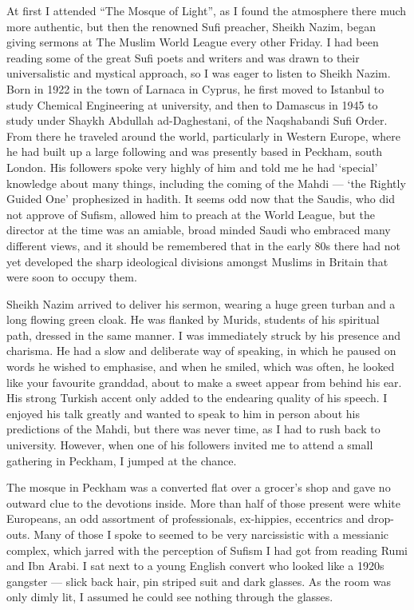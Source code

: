 \documentclass[12pt]{memoir}
\begin{document}
At first I attended “The Mosque of Light”,
as I found the atmosphere there much more authentic,
but then the renowned Sufi preacher, Sheikh Nazim,
began giving sermons at The Muslim World League every other Friday.
I had been reading some of the great Sufi poets and writers
and was drawn to their universalistic and mystical approach,
so I was eager to listen to Sheikh Nazim.
Born in 1922 in the town of Larnaca in Cyprus,
he first moved to Istanbul to study Chemical Engineering at university,
and then to Damascus in 1945 to study under Shaykh Abdullah ad-Daghestani,
of the Naqshabandi Sufi Order.
From there he traveled around the world, particularly in Western Europe,
where he had built up a large following and was presently based in Peckham,
south London.
His followers spoke very highly of him
and told me he had ‘special’ knowledge about many things,
including the coming of the Mahdi —
‘the Rightly Guided One’ prophesized in hadith.
It seems odd now that the Saudis, who did not approve of Sufism,
allowed him to preach at the World League,
but the director at the time was an amiable,
broad minded Saudi who embraced many different views,
and it should be remembered that in the early 80s
there had not yet developed the sharp ideological divisions
amongst Muslims in Britain that were soon to occupy them.

Sheikh Nazim arrived to deliver his sermon, wearing a huge green turban
and a long flowing green cloak.
He was flanked by Murids, students of his spiritual path,
dressed in the same manner.
I was immediately struck by his presence and charisma.
He had a slow and deliberate way of speaking,
in which he paused on words he wished to emphasise,
and when he smiled, which was often, he looked like your favourite granddad,
about to make a sweet appear from behind his ear.
His strong Turkish accent only added to the endearing quality of his speech.
I enjoyed his talk greatly and wanted to speak to him in person
about his predictions of the Mahdi, but there was never time,
as I had to rush back to university.
However, when one of his followers invited me
to attend a small gathering in Peckham, I jumped at the chance.

The mosque in Peckham was a converted flat over a grocer’s shop
and gave no outward clue to the devotions inside.
More than half of those present were white Europeans,
an odd assortment of professionals, ex-hippies, eccentrics and drop-outs.
Many of those I spoke to seemed to be very narcissistic
with a messianic complex,
which jarred with the perception of Sufism
I had got from reading Rumi and Ibn Arabi.
I sat next to a young English convert who looked like a 1920s gangster —
slick back hair, pin striped suit and dark glasses.
As the room was only dimly lit,
I assumed he could see nothing through the glasses.
\end{document}
